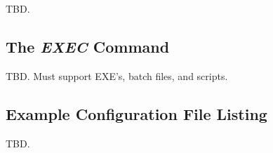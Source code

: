 \documentclass[letterpaper,10pt,titlepage]{article}
\begin{document}
TBD.

\subsection{The \emph{EXEC} Command}
\label{scff0:sexc0}

TBD.  Must support EXE's, batch files, and scripts.


\subsection{Example Configuration File Listing}
\label{scff0:sexp0}

TBD.

\end{document}
